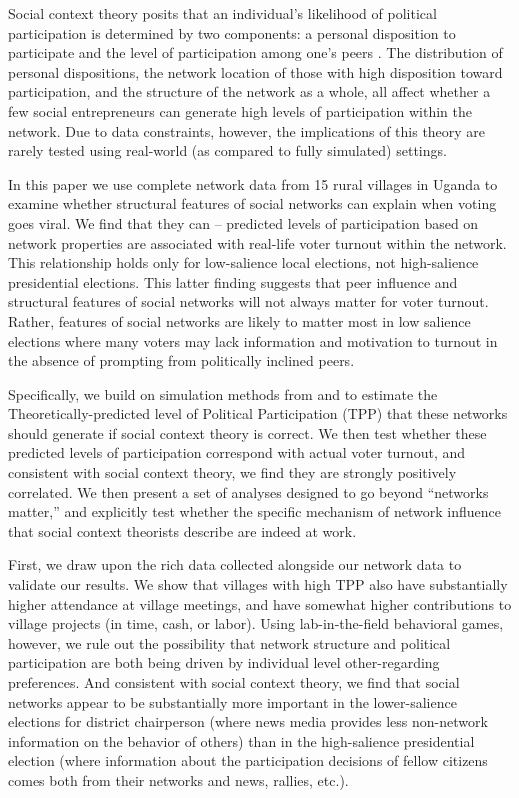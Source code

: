\documentclass[12pt]{article}
\begin{document}
Social context theory posits that an individual's likelihood of political participation is determined by two components: a personal disposition to participate and the level of participation among one's peers \citep{Fowler:2005ts,Siegel:2009vi,Rolfe:2012ka}. The distribution of personal dispositions, the network location of those with high disposition toward participation, and the structure of the network as a whole, all affect whether a few social entrepreneurs can generate high levels of participation within the network.  Due to data constraints, however, the implications of this theory are rarely tested using real-world (as compared to fully simulated) settings.

In this paper we use complete network data from 15 rural villages in Uganda to examine whether structural features of social networks can explain when voting goes viral.  We find that they can --  predicted levels of participation based on network properties are associated with real-life voter turnout within the network. This relationship holds only for low-salience local elections, not high-salience presidential elections. This latter finding suggests that peer influence and structural features of social networks will not always matter for voter turnout. Rather, features of social networks are likely to matter most in low salience elections where many voters may lack information and motivation to turnout in the absence of prompting from politically inclined peers.

Specifically, we build on simulation methods from \cite{Siegel:2009vi} and \cite{Rolfe:2012ka} to estimate the Theoretically-predicted level of Political Participation (TPP) that these networks should generate if social context theory is correct. We then test whether these predicted levels of participation correspond with actual voter turnout, %
and consistent with social context theory, we find they are strongly positively correlated. We then present a set of analyses designed to go beyond ``networks matter,'' and explicitly test whether the specific mechanism of network influence that social context theorists describe are indeed at work.

First, we draw upon the rich data collected alongside our network data to validate our results. We show that villages with high TPP also have substantially higher attendance at village meetings, and have somewhat higher contributions to village projects (in time, cash, or labor). Using lab-in-the-field behavioral games, however, we rule out the possibility that network structure and political participation are both being driven by individual level other-regarding preferences. And consistent with social context theory, we find that social networks appear to be substantially more important in the lower-salience elections for district chairperson (where news media provides less non-network information on the behavior of others) than in the high-salience presidential election (where information about the participation decisions of fellow citizens comes both from their networks and news, rallies, etc.).
\end{document}
